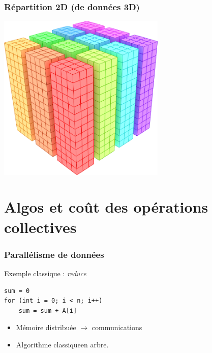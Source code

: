 \documentclass[xcolor={x11names,svgnames}]{beamer}
\begin{document}

\begin{frame}
\frametitle{Répartition 2D (de données 3D)}

\centering\includegraphics[height=8cm]{pencils.png}

\end{frame}


\section{Algos et coût des opérations collectives}

\begin{frame}[fragile]
\frametitle{Parallélisme de données}


\begin{block}{Exemple classique : \emph{reduce}}
\begin{verbatim}
sum = 0
for (int i = 0; i < n; i++)
    sum = sum + A[i]
\end{verbatim}
\end{block}

\bigskip

\begin{itemize}
\item Mémoire distribuée $\rightarrow$ communications
\item Algorithme \og classique\fg en arbre.
\end{itemize}
\end{frame}

\end{document}
